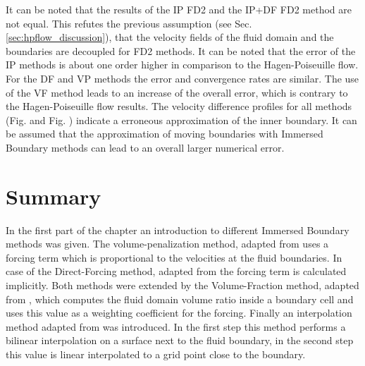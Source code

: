 It can be noted that the results of the IP FD2 and the IP+DF FD2 method are not equal.
This refutes the previous assumption (see Sec. \ref{sec:hpflow_discussion}),
that the velocity fields of the fluid domain and the boundaries are decoupled for FD2 methods.
It can be noted that  the error of the IP methods is about one order higher in comparison to the Hagen-Poiseuille flow.
For the DF and VP methods the error and convergence rates are similar.
The use of the VF method leads to an increase of the overall error, which is contrary to the Hagen-Poiseuille flow results.
The velocity difference profiles for all methods (Fig. and Fig. ) indicate a erroneous approximation of the inner boundary.
It can be assumed that the approximation of moving boundaries with Immersed Boundary methods can
lead to an overall larger numerical error.

\clearpage

\section{Summary}

In the first part of the chapter an introduction to different Immersed Boundary methods was given.
The volume-penalization method, adapted from  \citep{Lulff2011} uses a forcing term which is proportional to the velocities at the fluid boundaries.
In case of the Direct-Forcing method, adapted from \citep{Fadlun2000} the forcing term is calculated implicitly.
Both methods were extended by the Volume-Fraction method, adapted from \citep{Fadlun2000}, which computes the fluid domain volume ratio inside a boundary
cell and uses this value as a weighting coefficient for the forcing.
Finally an interpolation method adapted from  \citep{ Gilmanov2003} was introduced. In the first step this method performs a bilinear interpolation on a surface
next to the fluid boundary, in the second step this value is linear interpolated to a grid point close to the boundary.

